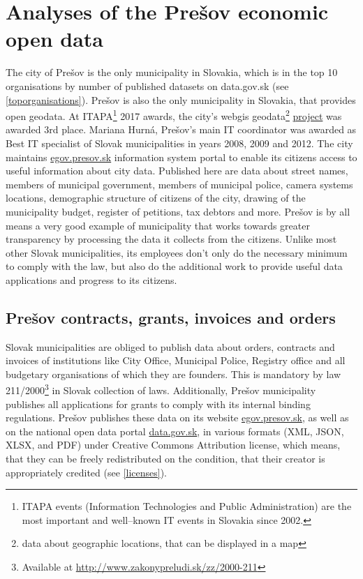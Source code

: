 \documentclass[thesis=B,english]{sprlajur-slovakopendata}[2018/05/12]
\begin{document}
\chapter{Analyses of the Prešov economic open data}
\label{presovopendata}
The city of Prešov is the only municipality in Slovakia, which is in the top 10 organisations by number of published datasets on data.gov.sk (see \ref{toporganisations}). Prešov is also the only municipality in Slovakia, that provides open geodata. At ITAPA\footnote{ITAPA events (Information Technologies and Public Administration) are the most important and well–known IT events in Slovakia since 2002.\cite{itapa}} 2017 awards, the city's webgis geodata\footnote{data about geographic locations, that can be displayed in a map} \href{http://webgis.presov.sk/}{project} was awarded 3rd place. Mariana Hurná, Prešov's main IT coordinator was awarded as Best IT specialist of Slovak municipalities in years 2008, 2009 and 2012. The city maintains \href{http://egov.presov.sk}{egov.presov.sk} information system  portal to enable its citizens access to useful information about city data. Published here are data about street names, members of municipal government, members of municipal police, camera systems locations, demographic structure of citizens of the city, drawing of the municipality budget, register of petitions, tax debtors and more. Prešov is by all means a very good example of municipality that works towards greater  transparency by processing the data it collects from the citizens. Unlike most other Slovak municipalities, its employees don't only do the necessary minimum to comply with the law, but also do the additional work to provide useful data applications and progress to its citizens.
	
\section{Prešov contracts, grants, invoices and orders}
\label{presovdataattributes}
Slovak municipalities are obliged to publish data about orders, contracts and invoices of institutions like City Office, Municipal Police, Registry office and all budgetary organisations of which they are founders. This is mandatory by law 211/2000\footnote{Available at \url{http://www.zakonypreludi.sk/zz/2000-211}} in Slovak collection of laws. Additionally, Prešov municipality  publishes all applications for grants to comply with its internal binding regulations. Prešov publishes these data on its website \url{egov.presov.sk}, as well as on the national open data portal \url{data.gov.sk}, in various formats (XML, JSON, XLSX, and PDF) under Creative Commons Attribution license, which means, that they can be freely redistributed on the condition, that their creator is appropriately credited (see \ref{licenses}). 
\end{document}
